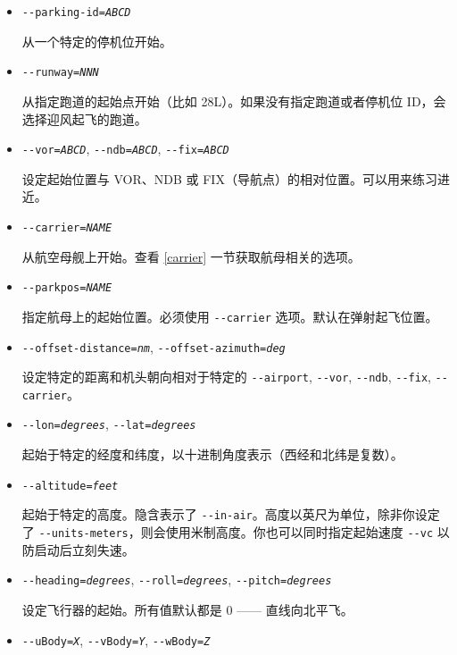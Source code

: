 \begin{itemize}
{\begin{itemize}
\item{\texttt{-$ $-parking-id={\it ABCD}}}

从一个特定的停机位开始。

\item{\texttt{-$ $-runway={\it NNN}}}

从指定跑道的起始点开始（比如 28L）。如果没有指定跑道或者停机位 ID，会选择迎风起飞的跑道。

 \item{\texttt{-$ $-vor={\it ABCD}}, \texttt{-$ $-ndb={\it ABCD}}, \texttt{-$ $-fix={\it ABCD}}}

设定起始位置与 VOR、NDB 或 FIX（导航点）的相对位置。可以用来练习进近。

\item{\texttt{-$ $-carrier={\it NAME}}}

从航空母舰上开始。查看 \ref{carrier} 一节获取航母相关的选项。

\item{\texttt{-$ $-parkpos={\it NAME}}}

指定航母上的起始位置。必须使用 \texttt{-$ $-carrier} 选项。默认在弹射起飞位置。

\item{\texttt{-$ $-offset-distance={\it nm}}, \texttt{-$ $-offset-azimuth={\it deg}}}

设定特定的距离和机头朝向相对于特定的 \texttt{-$ $-airport}, \texttt{-$ $-vor}, \texttt{-$ $-ndb}, \texttt{-$ $-fix}, \texttt{-$ $-carrier}。

 \item{\texttt{-$ $-lon={\it degrees}}, \texttt{-$ $-lat={\it degrees}}}

  起始于特定的经度和纬度，以十进制角度表示（西经和北纬是复数）。

\item{\texttt{-$ $-altitude={\it feet}}}

 起始于特定的高度。隐含表示了 \texttt{-$ $-in-air}。高度以英尺为单位，除非你设定了 \texttt{-$ $-units-meters}，则会使用米制高度。你也可以同时指定起始速度 \texttt{-$ $-vc} 以防启动后立刻失速。

\item{\texttt{-$ $-heading={\it degrees}}, \texttt{-$ $-roll={\it degrees}}, \texttt{-$ $-pitch={\it degrees}}}

设定飞行器的起始。所有值默认都是 0 —— 直线向北平飞。

\item{\texttt{-$ $-uBody={\it X}}, \texttt{-$ $-vBody={\it Y}}, \texttt{-$ $-wBody={\it Z}}}


\end{itemize}}
\end{itemize}
